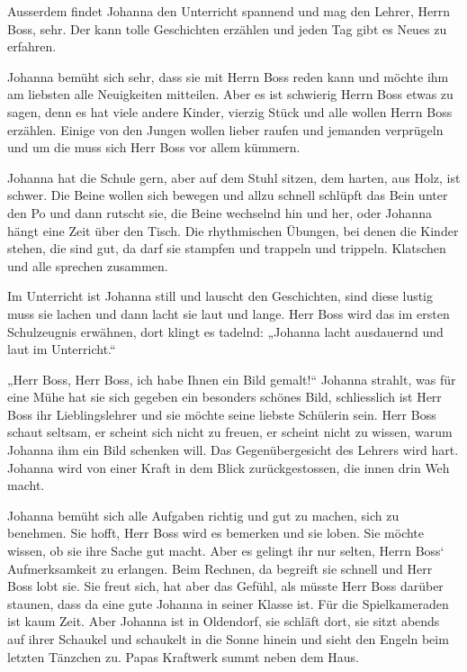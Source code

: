 \documentclass[10pt,titlepage,a5paper]{book}
\begin{document}
Ausserdem findet Johanna den Unterricht spannend und mag den Lehrer, Herrn Boss, sehr. Der kann tolle Geschichten erzählen und jeden Tag gibt es Neues zu erfahren. 

Johanna bemüht sich sehr, dass sie mit Herrn Boss reden kann und möchte ihm am liebsten alle Neuigkeiten mitteilen. Aber es ist schwierig Herrn Boss etwas zu sagen, denn es hat viele andere Kinder, vierzig Stück und alle wollen Herrn Boss erzählen. Einige von den Jungen wollen lieber raufen und jemanden verprügeln und um die muss sich Herr Boss vor allem kümmern.

Johanna hat die Schule gern, aber auf dem Stuhl sitzen, dem harten, aus Holz, ist schwer. Die Beine wollen sich bewegen und allzu schnell schlüpft das Bein unter den Po und dann rutscht sie, die Beine wechselnd hin und her, oder Johanna hängt eine Zeit über den Tisch. Die rhythmischen Übungen, bei denen die Kinder stehen, die sind gut, da darf sie stampfen und trappeln und trippeln. Klatschen und alle sprechen zusammen.

Im Unterricht ist Johanna still und lauscht den Geschichten, sind diese lustig muss sie lachen und dann lacht sie laut und lange. Herr Boss wird das im ersten Schulzeugnis erwähnen, dort klingt es tadelnd: „Johanna lacht ausdauernd und laut im Unterricht.“

„Herr Boss, Herr Boss, ich habe Ihnen ein Bild gemalt!“ Johanna strahlt, was für eine Mühe hat sie sich gegeben ein besonders schönes Bild, schliesslich ist Herr Boss ihr Lieblingslehrer und sie möchte seine liebste Schülerin sein. Herr Boss schaut seltsam, er scheint sich nicht zu freuen, er scheint nicht zu wissen, warum Johanna ihm ein Bild schenken will. Das Gegenübergesicht des Lehrers wird hart. Johanna wird von einer Kraft in dem Blick zurückge\-stossen, die innen drin Weh macht.

Johanna bemüht sich alle Aufgaben richtig und gut zu machen, sich zu benehmen. Sie hofft, Herr Boss wird es bemerken und sie loben. Sie möchte wissen, ob sie ihre Sache gut macht. Aber es gelingt ihr nur selten, Herrn Boss` Aufmerksamkeit  zu erlangen. Beim Rechnen, da begreift sie schnell und Herr Boss lobt sie. Sie freut sich, hat aber das Gefühl, als müsste Herr Boss darüber staunen, dass da eine gute Johanna in seiner Klasse ist.
Für die Spielkameraden ist kaum Zeit. Aber Johanna ist in Oldendorf, sie schläft dort, sie sitzt abends auf ihrer Schaukel und schaukelt in die Sonne hinein und sieht den Engeln beim letzten Tänzchen zu. Papas Kraftwerk summt neben dem Haus.
\end{document}

